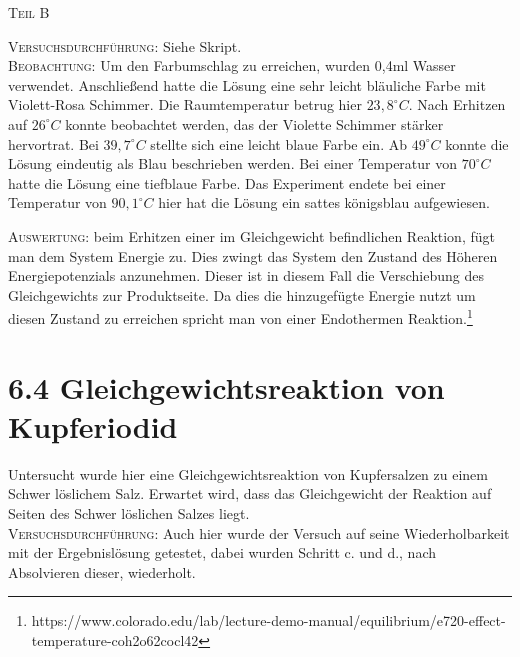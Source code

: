 \documentclass[12pt, a4paper]{article}
\begin{document}
\begin{center}
\textsc{Teil B}
\end{center}
\textsc{Versuchsdurchführung:} Siehe Skript.\\

\textsc{Beobachtung:}\hspace{5mm} Um den Farbumschlag zu erreichen, wurden 0,4ml Wasser verwendet. Anschließend hatte die Lösung eine sehr leicht bläuliche Farbe mit Violett-Rosa Schimmer. Die Raumtemperatur betrug hier $23,8^\circ C$. Nach Erhitzen auf $26^\circ C$ konnte beobachtet werden, das der Violette Schimmer stärker hervortrat. Bei $39,7^\circ C$ stellte sich eine leicht blaue Farbe ein. Ab $49^\circ C$ konnte die Lösung eindeutig als Blau beschrieben werden. Bei einer Temperatur von $70^\circ C$ hatte die Lösung eine tiefblaue Farbe. Das Experiment endete bei einer Temperatur von $90,1^\circ C$ hier hat die Lösung ein sattes königsblau aufgewiesen.

\textsc{Auswertung:}\hspace{8mm} beim Erhitzen einer im Gleichgewicht befindlichen Reaktion, fügt man dem System Energie zu. Dies zwingt das System den Zustand des Höheren Energiepotenzials anzunehmen. Dieser ist in diesem Fall die Verschiebung des Gleichgewichts zur Produktseite. Da dies die hinzugefügte Energie nutzt um diesen Zustand zu erreichen spricht man von einer Endothermen Reaktion.\footnote{https://www.colorado.edu/lab/lecture-demo-manual/equilibrium/e720-effect-temperature-coh2o62cocl42}


\newpage
\section{6.4 Gleichgewichtsreaktion von Kupferiodid}

Untersucht wurde hier eine Gleichgewichtsreaktion von Kupfersalzen zu einem Schwer löslichem Salz. Erwartet wird, dass das Gleichgewicht der Reaktion auf Seiten des Schwer löslichen Salzes liegt. \\

\textsc{Versuchsdurchführung:} Auch hier wurde der Versuch auf seine Wiederholbarkeit mit der Ergebnislösung getestet, dabei wurden Schritt c. und d., nach Absolvieren dieser, wiederholt.\\
\end{document}
